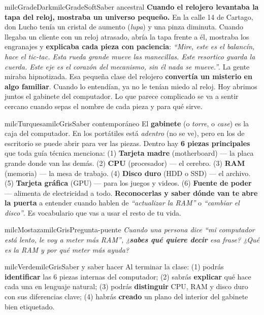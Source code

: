 \documentclass[11pt,letterpaper]{article}
\begin{document}
\begin{softbox}{milcGradeDark}{milcGradeSoft}{Saber ancestral}
\textbf{Cuando el relojero levantaba la tapa del reloj, mostraba un universo pequeño.} En la calle 14 de Cartago, don Lucho tenía un cristal de aumento (\emph{lupa}) y una pinza diminuta. Cuando llegaba un cliente con un reloj atrasado, abría la tapa frente a él, mostraba los engranajes y \textbf{explicaba cada pieza con paciencia}: \emph{``Mire, este es el balancín, hace el tic-tac. Esta rueda grande mueve las manecillas. Este resortico guarda la cuerda. Este eje es el corazón del mecanismo, sin él nada se mueve.''}. La gente miraba hipnotizada. Esa pequeña clase del relojero \textbf{convertía un misterio en algo familiar}. Cuando lo entendían, ya no le tenían miedo al reloj. Hoy abrimos juntos el gabinete del computador. Lo que parece complicado se va a sentir cercano cuando sepas el nombre de cada pieza y para qué sirve.
\end{softbox}

\begin{softbox}{milcTurquesa}{milcGris}{Saber contemporáneo}
El \textbf{gabinete} (o \emph{torre}, o \emph{case}) es la caja del computador. En los portátiles está \emph{adentro} (no se ve), pero en los de escritorio se puede abrir para ver las piezas. Dentro hay \textbf{6 piezas principales} que toda guía técnica menciona: (1) \textbf{Tarjeta madre} (motherboard) --- la placa grande donde van las demás. (2) \textbf{CPU} (procesador) --- el cerebro. (3) \textbf{RAM} (memoria) --- la mesa de trabajo. (4) \textbf{Disco duro} (HDD o SSD) --- el archivo. (5) \textbf{Tarjeta gráfica} (GPU) --- para los juegos y videos. (6) \textbf{Fuente de poder} --- alimenta de electricidad a todo. \textbf{Reconocerlas y saber dónde van te abre la puerta} a entender cuando hablen de \emph{``actualizar la RAM''} o \emph{``cambiar el disco''}. Es vocabulario que vas a usar el resto de tu vida.
\end{softbox}

\begin{softbox}{milcMostaza}{milcGris}{Pregunta-puente}
\textit{Cuando una persona dice \emph{``mi computador está lento, le voy a meter más RAM''}, ¿\textbf{sabes qué quiere decir} esa frase? ¿Qué es la RAM y por qué meter más ayuda?}
\end{softbox}

\begin{softbox}{milcVerde}{milcGris}{Saber y saber hacer}
Al terminar la clase: (1) podrás \textbf{identificar} las 6 piezas internas del computador; (2) sabrás \textbf{explicar} qué hace cada una en lenguaje natural; (3) podrás \textbf{distinguir} CPU, RAM y disco duro con sus diferencias clave; (4) habrás \textbf{creado} un plano del interior del gabinete bien etiquetado.
\end{softbox}
\end{document}
